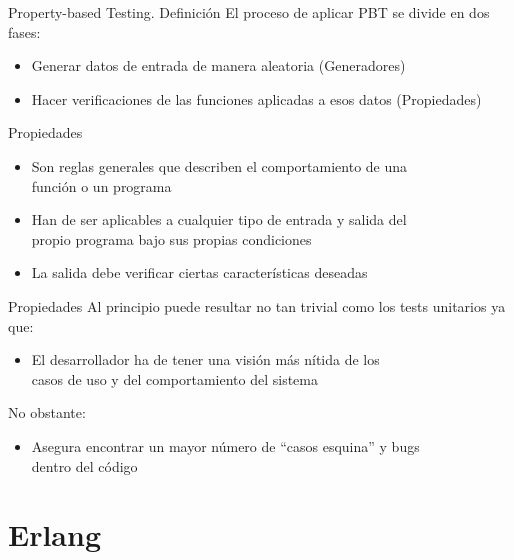 \documentclass{beamer}
\begin{document}
    \begin{frame}{Property-based Testing. Definición}
      El proceso de aplicar PBT se divide en dos fases:
      \begin{itemize}
        \pause
        \item Generar datos de entrada de manera aleatoria (Generadores)
        \pause
        \item Hacer verificaciones de las funciones aplicadas a esos datos (Propiedades)
      \end{itemize}
    \end{frame}

    \begin{frame}{Propiedades}
      \begin{itemize}
        \item Son reglas generales que describen el comportamiento de una\\
        función o un programa
        \item Han de ser aplicables a cualquier tipo de entrada y salida del\\
        propio programa bajo sus propias condiciones
        \item La salida debe verificar ciertas características deseadas
      \end{itemize}
    \end{frame}

    \begin{frame}{Propiedades}
      Al principio puede resultar no tan trivial como los tests unitarios ya que:
      \begin{itemize}
        \item El desarrollador ha de tener una visión más nítida de los\\
        casos de uso y del comportamiento del sistema
      \end{itemize}
      No obstante:
      \begin{itemize}
        \item Asegura encontrar un mayor número de ``casos esquina'' y bugs\\
        dentro del código
      \end{itemize}
    \end{frame}

  \section{Erlang}
\end{document}
